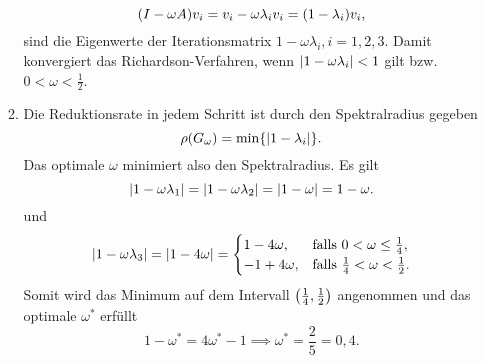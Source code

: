 \documentclass{exercise}
\begin{document}
\begin{enumerate}
\begin{enumerate}
            \[
                \parentheses*{I - \omega A}v_i = v_i - \omega\lambda_i v_i = \parentheses*{1 - \lambda_i}v_i,
            \]
            sind die Eigenwerte der Iterationsmatrix \(1 - \omega\lambda_i, i = 1, 2, 3\).
            Damit konvergiert das Richardson-Verfahren, wenn \(\absolute*{1 - \omega\lambda_i} < 1\) gilt bzw. \(0 < \omega < \frac{1}{2}\).
            \item Die Reduktionsrate in jedem Schritt ist durch den Spektralradius gegeben
            \[
                \rho\parentheses*{G_\omega} = \min\braces*{\absolute*{1 - \lambda_i}}.
            \]
            Das optimale \(\omega\) minimiert also den Spektralradius.
            Es gilt
            \[
                \absolute*{1 - \omega\lambda_1} = \absolute*{1 - \omega\lambda_2} = \absolute*{1 - \omega} = 1 - \omega.
            \]
            und
            \[
                \absolute*{1 - \omega\lambda_3} = \absolute*{1 - 4\omega} = \begin{cases}
                    1 - 4\omega, & \text{falls }0 < \omega \le \frac{1}{4},\\
                    -1 + 4\omega, & \text{falls }\frac{1}{4} < \omega < \frac{1}{2}.
                \end{cases}
            \]
            Somit wird das Minimum auf dem Intervall \(\parentheses*{\frac{1}{4}, \frac{1}{2}}\) angenommen und das optimale \(\omega^*\) erfüllt
            \[
                1 - \omega^* = 4\omega^* - 1 \implies \omega^* = \frac{2}{5} = 0,4.
            \]
        \end{enumerate}
    \end{enumerate}
\end{document}
